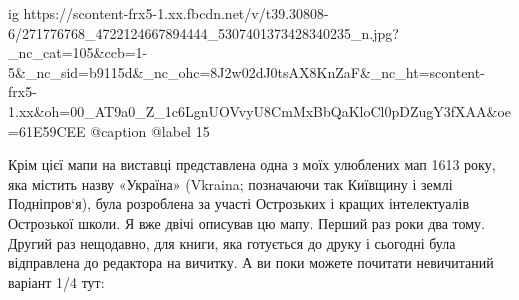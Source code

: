  
 
 
 
 

\ifcmt
  ig https://scontent-frx5-1.xx.fbcdn.net/v/t39.30808-6/271776768_4722124667894444_5307401373428340235_n.jpg?_nc_cat=105&ccb=1-5&_nc_sid=b9115d&_nc_ohc=8J2w02dJ0tsAX8KnZaF&_nc_ht=scontent-frx5-1.xx&oh=00_AT9a0_Z_1c6LgnUOVvyU8CmMxBbQaKloCl0pDZugY3fXAA&oe=61E59CEE
  @caption @label 15
\fi


Крім цієї мапи на виставці представлена одна з моїх улюблених мап 1613 року,
яка містить назву «Україна» (Vkraina; позначаючи так Київщину і землі
Подніпров‘я), була розроблена за участі Острозьких і кращих інтелектуалів
Острозької школи.  Я вже двічі описував цю мапу. Перший раз роки два тому.
Другий раз нещодавно, для книги, яка готується до друку і сьогодні була
відправлена до редактора на вичитку.  А ви поки можете почитати невичитаний
варіант 1/4 тут:
